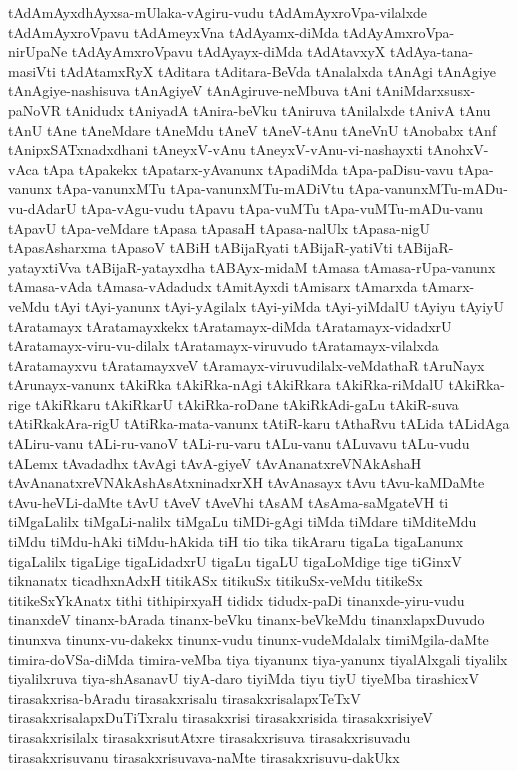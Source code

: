 {tAdAmAyxdhAyxsa-mUlaka-vAgiru-vudu
tAdAmAyxroVpa-vilalxde
tAdAmAyxroVpavu
tAdAmeyxVna
tAdAyamx-diMda
tAdAyAmxroVpa-nirUpaNe
tAdAyAmxroVpavu
tAdAyayx-diMda
tAdAtavxyX
tAdAya-tana-masiVti
tAdAtamxRyX
tAditara
tAditara-BeVda
tAnalalxda
tAnAgi
tAnAgiye
tAnAgiye-nashisuva
tAnAgiyeV
tAnAgiruve-neMbuva
tAni
tAniMdarxsusx-paNoVR
tAnidudx
tAniyadA
tAnira-beVku
tAniruva
tAnilalxde
tAnivA
tAnu
tAnU
tAne
tAneMdare
tAneMdu
tAneV
tAneV-tAnu
tAneVnU
tAnobabx
tAnf
tAnipxSATxnadxdhani
tAneyxV-vAnu
tAneyxV-vAnu-vi-nashayxti
tAnohxV-vAca
tApa
tApakekx
tApatarx-yAvanunx
tApadiMda
tApa-paDisu-vavu
tApa-vanunx
tApa-vanunxMTu
tApa-vanunxMTu-mADiVtu
tApa-vanunxMTu-mADu-vu-dAdarU
tApa-vAgu-vudu
tApavu
tApa-vuMTu
tApa-vuMTu-mADu-vanu
tApavU
tApa-veMdare
tApasa
tApasaH
tApasa-nalUlx
tApasa-nigU
tApasAsharxma
tApasoV
tABiH
tABijaRyati
tABijaR-yatiVti
tABijaR-yatayxtiVva
tABijaR-yatayxdha
tABAyx-midaM
tAmasa
tAmasa-rUpa-vanunx
tAmasa-vAda
tAmasa-vAdadudx
tAmitAyxdi
tAmisarx
tAmarxda
tAmarx-veMdu
tAyi
tAyi-yanunx
tAyi-yAgilalx
tAyi-yiMda
tAyi-yiMdalU
tAyiyu
tAyiyU
tAratamayx
tAratamayxkekx
tAratamayx-diMda
tAratamayx-vidadxrU
tAratamayx-viru-vu-dilalx
tAratamayx-viruvudo
tAratamayx-vilalxda
tAratamayxvu
tAratamayxveV
tAramayx-viruvudilalx-veMdathaR
tAruNayx
tArunayx-vanunx
tAkiRka
tAkiRka-nAgi
tAkiRkara
tAkiRka-riMdalU
tAkiRka-rige
tAkiRkaru
tAkiRkarU
tAkiRka-roDane
tAkiRkAdi-gaLu
tAkiR-suva
tAtiRkakAra-rigU
tAtiRka-mata-vanunx
tAtiR-karu
tAthaRvu
tALida
tALidAga
tALiru-vanu
tALi-ru-vanoV
tALi-ru-varu
tALu-vanu
tALuvavu
tALu-vudu
tALemx
tAvadadhx
tAvAgi
tAvA-giyeV
tAvAnanatxreVNAkAshaH
tAvAnanatxreVNAkAshAsAtxninadxrXH
tAvAnasayx
tAvu
tAvu-kaMDaMte
tAvu-heVLi-daMte
tAvU
tAveV
tAveVhi
tAsAM
tAsAma-saMgateVH
ti
tiMgaLalilx
tiMgaLi-nalilx
tiMgaLu
tiMDi-gAgi
tiMda
tiMdare
tiMditeMdu
tiMdu
tiMdu-hAki
tiMdu-hAkida
tiH
tio
tika
tikAraru
tigaLa
tigaLanunx
tigaLalilx
tigaLige
tigaLidadxrU
tigaLu
tigaLU
tigaLoMdige
tige
tiGinxV
tiknanatx
ticadhxnAdxH
titikASx
titikuSx
titikuSx-veMdu
titikeSx
titikeSxYkAnatx
tithi
tithipirxyaH
tididx
tidudx-paDi
tinanxde-yiru-vudu
tinanxdeV
tinanx-bArada
tinanx-beVku
tinanx-beVkeMdu
tinanxlapxDuvudo
tinunxva
tinunx-vu-dakekx
tinunx-vudu
tinunx-vudeMdalalx
timiMgila-daMte
timira-doVSa-diMda
timira-veMba
tiya
tiyanunx
tiya-yanunx
tiyalAlxgali
tiyalilx
tiyalilxruva
tiya-shAsanavU
tiyA-daro
tiyiMda
tiyu
tiyU
tiyeMba
tirashicxV
tirasakxrisa-bAradu
tirasakxrisalu
tirasakxrisalapxTeTxV
tirasakxrisalapxDuTiTxralu
tirasakxrisi
tirasakxrisida
tirasakxrisiyeV
tirasakxrisilalx
tirasakxrisutAtxre
tirasakxrisuva
tirasakxrisuvadu
tirasakxrisuvanu
tirasakxrisuvava-naMte
tirasakxrisuvu-dakUkx
}
